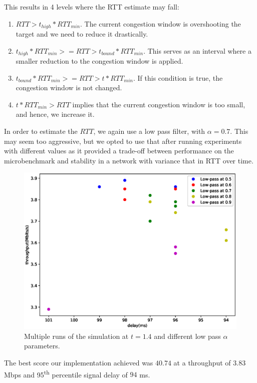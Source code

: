 \documentclass[12pt]{article}
\begin{document}
This results in 4 levels where the RTT estimate may fall:
\begin{enumerate}
\item $RTT > t_{high} * RTT_{min}$. The current congestion window is
overshooting the target and we need to reduce it drastically.
\item $t_{high}*RTT_{min} >= RTT > t_{bound}*RTT_{min}$. This serves as an
interval where a smaller reduction to the congestion window is applied.
\item $t_{bound} *RTT_{min} >= RTT > t * {RTT_{min}}$. If this condition is
true, the congestion window is not changed.
\item $t * RTT_{min} > RTT$ implies that the current congestion window is too
small, and hence, we increase it.
\end{enumerate}

In order to estimate the $RTT$, we again use a low pass filter, with $\alpha =
0.7$. This may seem too aggressive, but we opted to use that after running
experiments with different values as it provided a trade-off between performance
on the microbenchmark and stability in a network with variance that in RTT over
time.

\begin{figure}[h]
\includegraphics[width=\textwidth,height=\textheight,keepaspectratio]{figure_2.eps}
\caption{Multiple runs of the simulation at $t=1.4$ and different low pass
$\alpha$ parameters.}
\label{fig:low-pass-1-4}
\end{figure}

The best score our implementation achieved was $40.74$ at a throughput of $3.83$
Mbps and 95\textsuperscript{th} percentile signal delay of $94$ ms.
\end{document}
